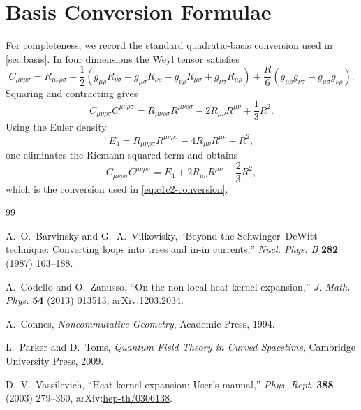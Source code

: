 \documentclass[11pt,a4paper]{article}
\newcommand{\Weylsq}{C_{\mu\nu\rho\sigma}C^{\mu\nu\rho\sigma}}
\newcommand{\Rsq}{R^2}
\newcommand{\Ricsq}{R_{\mu\nu}R^{\mu\nu}}
\theoremstyle{definition}
\theoremstyle{remark}
\begin{document}
\section{Basis Conversion Formulae}
\label{app:basis}

For completeness, we record the standard quadratic-basis conversion used in
\cref{sec:basis}.  In four dimensions the Weyl tensor satisfies
\begin{equation}
  C_{\mu\nu\rho\sigma}
  = R_{\mu\nu\rho\sigma}
  - \frac{1}{2}\left(
      g_{\mu\rho}R_{\nu\sigma}
      - g_{\mu\sigma}R_{\nu\rho}
      - g_{\nu\rho}R_{\mu\sigma}
      + g_{\nu\sigma}R_{\mu\rho}
    \right)
  + \frac{R}{6}\left(
      g_{\mu\rho}g_{\nu\sigma}
      - g_{\mu\sigma}g_{\nu\rho}
    \right).
  \label{eq:weyl-def-app}
\end{equation}
Squaring and contracting gives
\begin{equation}
  \Weylsq
  = R_{\mu\nu\rho\sigma}R^{\mu\nu\rho\sigma}
  - 2\Ricsq + \frac{1}{3}\Rsq.
  \label{eq:weyl-square-app}
\end{equation}
Using the Euler density
\begin{equation}
  E_4
  = R_{\mu\nu\rho\sigma}R^{\mu\nu\rho\sigma}
  - 4\Ricsq + \Rsq,
  \label{eq:euler-app}
\end{equation}
one eliminates the Riemann-squared term and obtains
\begin{equation}
  \Weylsq = E_4 + 2\Ricsq - \frac{2}{3}\Rsq,
  \label{eq:weyl-to-ricci-app}
\end{equation}
which is the conversion used in \eqref{eq:c1c2-conversion}.

\begin{thebibliography}{99}

A.~O.~Barvinsky and G.~A.~Vilkovisky,
``Beyond the Schwinger--DeWitt technique: Converting loops into trees and
in-in currents,''
\emph{Nucl. Phys. B} \textbf{282} (1987) 163--188.

A.~Codello and O.~Zanusso,
``On the non-local heat kernel expansion,''
\emph{J. Math. Phys.} \textbf{54} (2013) 013513,
arXiv:\href{https://arxiv.org/abs/1203.2034}{1203.2034}.

A.~Connes,
\emph{Noncommutative Geometry},
Academic Press, 1994.

L.~Parker and D.~Toms,
\emph{Quantum Field Theory in Curved Spacetime},
Cambridge University Press, 2009.

D.~V.~Vassilevich,
``Heat kernel expansion: User's manual,''
\emph{Phys. Rept.} \textbf{388} (2003) 279--360,
arXiv:\href{https://arxiv.org/abs/hep-th/0306138}{hep-th/0306138}.

\end{thebibliography}
\end{document}
